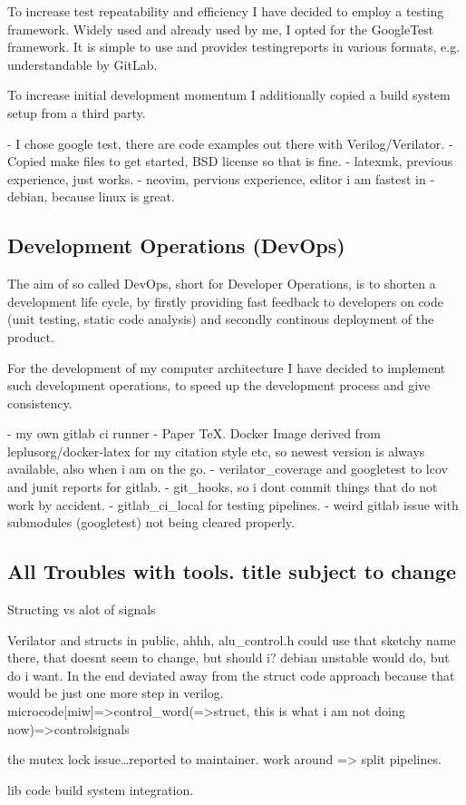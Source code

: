 To increase test repeatability and efficiency I have decided to employ a testing framework. Widely used and already used by me, I opted for the GoogleTest framework. It is simple to use and provides testingreports in various formats, e.g. understandable by GitLab. 

To increase initial development momentum I additionally copied a build system setup from a third party.


- I chose google test, there are code examples out there with Verilog/Verilator. 
- Copied make files to get started, BSD license so that is fine. 
- latexmk, previous experience, just works.
- neovim, pervious experience, editor i am fastest in
- debian, because linux is great. 


\subsection{Development Operations (DevOps)}
The aim of so called DevOps, short for Developer Operations, is to shorten a development life cycle, by firstly providing fast feedback to developers on code (unit testing, static code analysis) and secondly continous deployment of the product.  

For the development of my computer architecture I have decided to implement such development operations, to speed up the development process and give consistency. 

- my own gitlab ci runner
- Paper TeX. Docker Image derived from leplusorg/docker-latex for my citation style etc, so newest version is always available, also when i am on the go. 
- verilator\_coverage and googletest to lcov and junit reports for gitlab. 
- git\_hooks, so i dont commit things that do not work by accident. 
- gitlab\_ci\_local for testing pipelines. 
- weird gitlab issue with submodules (googletest) not being cleared properly. 

\subsection{All Troubles with tools. title subject to change}
Structing vs alot of signals

Verilator and structs in public, ahhh, alu\_control.h could use that sketchy name there, that doesnt seem to change, but should i?
debian unstable would do, but do i want. 
In the end deviated away from the struct code approach because that would be just one more step in verilog. microcode[miw]=>control\_word(=>struct, this is what i am not doing now)=>controlsignals

the mutex lock issue\dots reported to maintainer. 
work around => split pipelines. 

lib code build system integration. 









